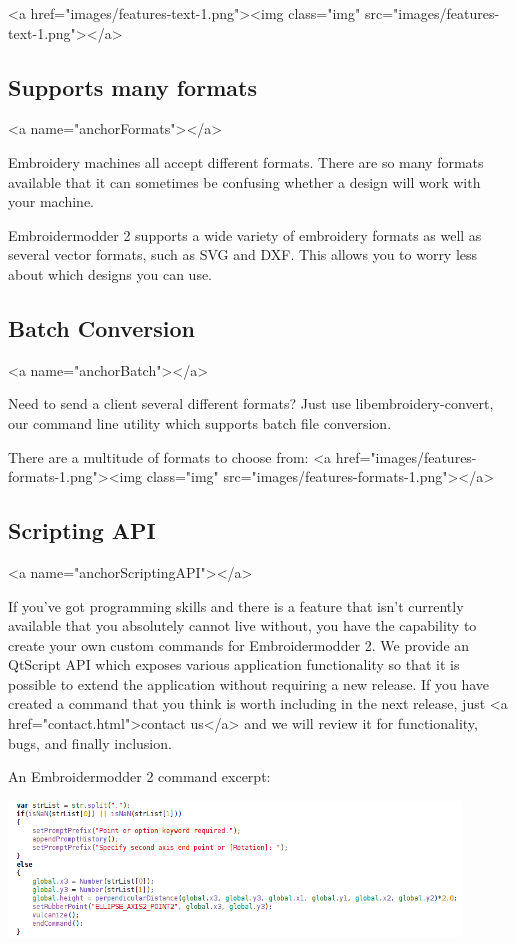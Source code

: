 \documentclass[a4paper, 11pt]{report}
\begin{document}
<a href="images/features-text-1.png"><img class="img" src="images/features-text-1.png"></a>

\subsection{Supports many formats}
<a name="anchorFormats"></a>

Embroidery machines all accept different formats. There are so many formats available that it can sometimes be confusing whether a design will work with your machine.

Embroidermodder 2 supports a wide variety of embroidery formats as well as several vector formats, such as SVG and DXF. This allows you to worry less about which designs you can use.

\subsection{Batch Conversion}
<a name="anchorBatch"></a>

Need to send a client several different formats? Just use libembroidery-convert, our command line utility which supports batch file conversion.

There are a multitude of formats to choose from:
<a href="images/features-formats-1.png"><img class="img" src="images/features-formats-1.png"></a>

\subsection{Scripting API}

<a name="anchorScriptingAPI"></a>

If you've got programming skills and there is a feature that isn't currently available that you absolutely cannot live without, you have the capability to create your own custom commands for Embroidermodder 2. We provide an QtScript API which exposes various application functionality so that it is possible to extend the application without requiring a new release. If you have created a command that you think is worth including in the next release, just <a href="contact.html">contact us</a> and we will review it for functionality, bugs, and finally inclusion.

An Embroidermodder 2 command excerpt:

\includegraphics[width=0.9\textwidth]{images/features-scripting-1.png}
\end{document}
